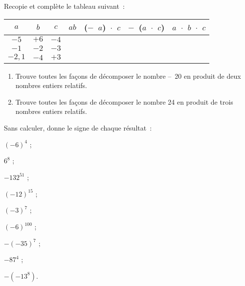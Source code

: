 \begin{exercice}
Recopie et complète le tableau suivant :
\begin{center}
\begin{tabular}{|c|c|c|c|c|c|c|}
\hline
\cellcolor{H2} $a$ & \cellcolor{H2} $b$ & \cellcolor{H2} $c$ & \cellcolor{A2} $ab$ &  \cellcolor{A2} ($-$ $a$) $\cdot$ $c$ &  \cellcolor{A2} $-$ ($a$ $\cdot$ $c$) &  \cellcolor{A2} $a$ $\cdot$ $b$ $\cdot$ $c$ \\\hline 
\cellcolor{H3} $- 5$ & \cellcolor{H3} $+ 6$ & \cellcolor{H3} $- 4$ & \cellcolor{A3} & \cellcolor{A3} & \cellcolor{A3} & \cellcolor{A3} \\\hline
\cellcolor{H3} $- 1$ & \cellcolor{H3} $- 2$ & \cellcolor{H3} $- 3$ & \cellcolor{A3} & \cellcolor{A3} & \cellcolor{A3} & \cellcolor{A3} \\\hline
\cellcolor{H3} $- 2,1$ & \cellcolor{H3} $- 4$ & \cellcolor{H3} $+ 3$ & \cellcolor{A3} & \cellcolor{A3} & \cellcolor{A3} & \cellcolor{A3} \\\hline
 \end{tabular}
 \end{center}
\end{exercice}


\begin{exercice}
\begin{enumerate}
 \item Trouve toutes les façons de décomposer le nombre – 20 en produit de deux nombres entiers relatifs.
 \item Trouve toutes les façons de décomposer le nombre 24 en produit de trois nombres entiers relatifs.
 \end{enumerate}
\end{exercice}


\begin{exercice}
Sans calculer, donne le signe de chaque résultat :
\begin{colenumerate}{3}
 \item $(- 6)^{4}$ ;
 \item $6^{8}$ ;
 \item $- 132^{51}$ ;
 \item $(- 12)^{15}$ ;
 \item $(- 3)^{7}$ ;
 \item $(- 6)^{100}$ ;
 \item $- (- 35)^{7}$ ;
 \item $- 87^{4}$ ;
 \item $- (- 13^{8})$.
 \end{colenumerate}
\end{exercice}


